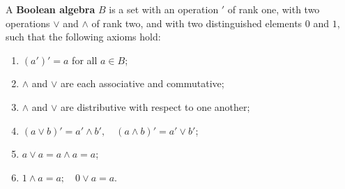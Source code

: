 A \textbf{Boolean algebra} $B$ is a set with an operation $'$ of rank one, with two operations $\lor$ and $\land$ of rank two, and with two distinguished elements $0$ and $1$, such that the following axioms hold:

\begin{enumerate}
\item[(a)] $(a')' = a$ for all $a \in B$;
\item[(b)] $\land$ and $\lor$ are each associative and commutative;
\item[(c)] $\land$ and $\lor$ are distributive with respect to one another;
\item[(d)] $(a \lor b)' = a' \land b', \quad (a \land b)' = a' \lor b'$;
\item[(e)] $a \lor a = a \land a = a$;
\item[(f)] $1 \land a = a; \quad 0 \lor a = a$.
\end{enumerate}
